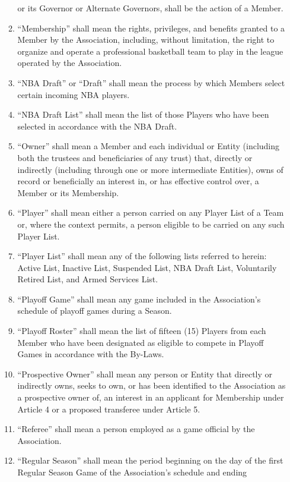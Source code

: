 \documentclass[]{book}
\theoremstyle{definition}
\theoremstyle{definition}
\theoremstyle{definition}
\theoremstyle{remark}
\begin{document}
\begin{enumerate}
\begin{enumerate}
    or its Governor or Alternate Governors, shall be the action of a
    Member.
  \item
    ``Membership'' shall mean the rights, privileges, and benefits
    granted to a Member by the Association, including, without
    limitation, the right to organize and operate a professional
    basketball team to play in the league operated by the Association.
  \item
    ``NBA Draft'' or ``Draft'' shall mean the process by which Members
    select certain incoming NBA players.
  \item
    ``NBA Draft List'' shall mean the list of those Players who have
    been selected in accordance with the NBA Draft.
  \item
    ``Owner'' shall mean a Member and each individual or Entity
    (including both the trustees and beneficiaries of any trust) that,
    directly or indirectly (including through one or more intermediate
    Entities), owns of record or beneficially an interest in, or has
    effective control over, a Member or its Membership.
  \item
    ``Player'' shall mean either a person carried on any Player List of
    a Team or, where the context permits, a person eligible to be
    carried on any such Player List.
  \item
    ``Player List'' shall mean any of the following lists referred to
    herein: Active List, Inactive List, Suspended List, NBA Draft List,
    Voluntarily Retired List, and Armed Services List.
  \item
    ``Playoff Game'' shall mean any game included in the Association's
    schedule of playoff games during a Season.
  \item
    ``Playoff Roster'' shall mean the list of fifteen (15) Players from
    each Member who have been designated as eligible to compete in
    Playoff Games in accordance with the By-Laws.
  \item
    ``Prospective Owner'' shall mean any person or Entity that directly
    or indirectly owns, seeks to own, or has been identified to the
    Association as a prospective owner of, an interest in an applicant
    for Membership under Article 4 or a proposed transferee under
    Article 5.
  \item
    ``Referee'' shall mean a person employed as a game official by the
    Association.
  \item
    ``Regular Season'' shall mean the period beginning on the day of the
    first Regular Season Game of the Association's schedule and ending

\end{enumerate}
\end{enumerate}
\end{document}
